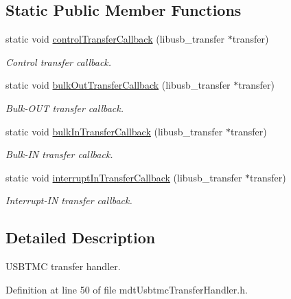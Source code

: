\subsection*{Static Public Member Functions}
\begin{DoxyCompactItemize}
\item 
static void \hyperlink{classmdt_usbtmc_transfer_handler_a97889efecb395570d32ec829dc915d93}{control\-Transfer\-Callback} (libusb\-\_\-transfer $\ast$transfer)
\begin{DoxyCompactList}\small\item\em Control transfer callback. \end{DoxyCompactList}\item 
static void \hyperlink{classmdt_usbtmc_transfer_handler_a6c6e86738b94f04e8df0830c58a0bbfa}{bulk\-Out\-Transfer\-Callback} (libusb\-\_\-transfer $\ast$transfer)
\begin{DoxyCompactList}\small\item\em Bulk-\/\-O\-U\-T transfer callback. \end{DoxyCompactList}\item 
static void \hyperlink{classmdt_usbtmc_transfer_handler_a4b20c2f75e8c53a33031c79b92f1d125}{bulk\-In\-Transfer\-Callback} (libusb\-\_\-transfer $\ast$transfer)
\begin{DoxyCompactList}\small\item\em Bulk-\/\-I\-N transfer callback. \end{DoxyCompactList}\item 
static void \hyperlink{classmdt_usbtmc_transfer_handler_aa6f83ef50e46b373bc0ca9c4413ea494}{interrupt\-In\-Transfer\-Callback} (libusb\-\_\-transfer $\ast$transfer)
\begin{DoxyCompactList}\small\item\em Interrupt-\/\-I\-N transfer callback. \end{DoxyCompactList}\end{DoxyCompactItemize}


\subsection{Detailed Description}
U\-S\-B\-T\-M\-C transfer handler. 

Definition at line 50 of file mdt\-Usbtmc\-Transfer\-Handler.\-h.




